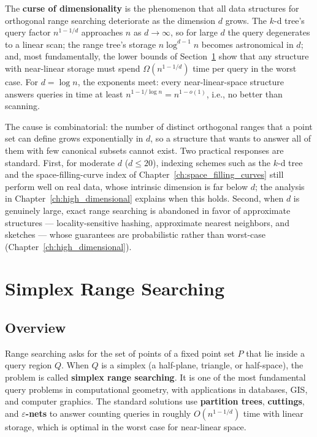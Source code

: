 The \textbf{curse of dimensionality} is the
phenomenon that all data structures for orthogonal range searching
deteriorate as the dimension $d$ grows. The $k$-d tree's query factor
$n^{1-1/d}$ approaches $n$ as $d \to \infty$, so for large $d$ the query
degenerates to a linear scan; the range tree's storage
$n\log^{d-1} n$ becomes astronomical in $d$; and, most fundamentally, the
lower bounds of Section~\ref{sec:rangesearch_simplex} show that any
structure with near-linear storage must spend $\Omega(n^{1-1/d})$ time per
query in the worst case. For $d = \log n$, the exponents meet: every
near-linear-space structure answers queries in time at least $n^{1-1/\log
n} = n^{1 - o(1)}$, i.e., no better than scanning.

The cause is combinatorial: the number of distinct orthogonal ranges that
a point set can define grows exponentially in $d$, so a structure that
wants to answer all of them with few canonical subsets cannot exist. Two
practical responses are standard. First, for moderate $d$ ($d \le 20$),
indexing schemes such as the $k$-d tree and the space-filling-curve index
of Chapter~\ref{ch:space_filling_curves} still perform well on real data,
whose intrinsic dimension is far below $d$; the analysis in
Chapter~\ref{ch:high_dimensional} explains when this holds. Second, when
$d$ is genuinely large, exact range searching is abandoned in favor of
approximate structures --- locality-sensitive hashing, approximate nearest
neighbors, and sketches --- whose guarantees are probabilistic rather than
worst-case (Chapter~\ref{ch:high_dimensional}).

\section{Simplex Range Searching}
\label{sec:rangesearch_simplex}

\subsection{Overview}
Range searching asks for the set of points of a fixed point set $P$ that lie
inside a query region $Q$. When $Q$ is a simplex (a half-plane, triangle, or
half-space), the problem is called \textbf{simplex range searching}. It is one
of the most fundamental query problems in computational geometry, with
applications in databases, GIS, and computer graphics. The standard solutions
use \textbf{partition trees}, \textbf{cuttings}, and \textbf{$\varepsilon$-nets}
to answer counting queries in roughly $O(n^{1-1/d})$ time with linear storage,
which is optimal in the worst case for near-linear space.

